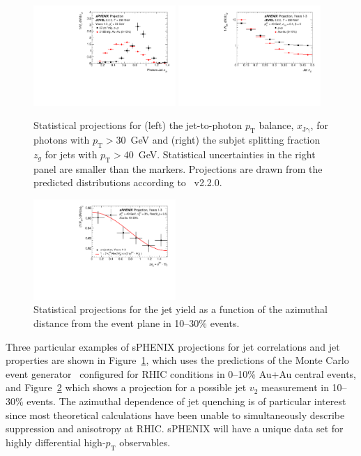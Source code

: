 \begin{figure}[h]
\centering
\includegraphics[width=0.48\textwidth]{figs/xJg_1.pdf}
\includegraphics[width=0.48\textwidth]{figs/zg_1.pdf}
\caption{Statistical projections for (left) the jet-to-photon
  $p_\mathrm{T}$ balance, $x_\mathrm{J\gamma}$, for photons with
  $p_\mathrm{T} > 30$~GeV and (right) the subjet splitting fraction
  $z_g$ for jets with $p_\mathrm{T} >
  40$~GeV.  Statistical uncertainties in the right panel are smaller than the markers.
  Projections are drawn from the predicted distributions
  according to \jewel~v2.2.0.}
\label{fig:jet_JEWEL_proj}
\end{figure}

\begin{figure}[h]
\centering
\includegraphics[width=0.48\textwidth]{figs/jet_dphi_1}
\caption{Statistical projections for the jet yield as a function of
  the azimuthal distance from the event plane in 10--30\% \auau
  events.}
\label{fig:jet_dphi_proj}
\end{figure}

Three particular examples of sPHENIX projections for jet correlations
and jet properties are shown in Figure~\ref{fig:jet_JEWEL_proj}, which
uses the predictions of the \jewel Monte Carlo event
generator~\cite{KunnawalkamElayavalli:2016ttl} configured for RHIC
conditions in 0--10\% Au+Au central events, and
Figure~\ref{fig:jet_dphi_proj} which shows a projection for a possible
jet $v_2$ measurement in 10--30\% \auau events.   The azimuthal dependence of jet quenching is of particular interest since most theoretical calculations have been unable to simultaneously describe suppression and anisotropy at RHIC.   sPHENIX will have a unique data set
for highly differential high-$p_\mathrm{T}$ observables.

